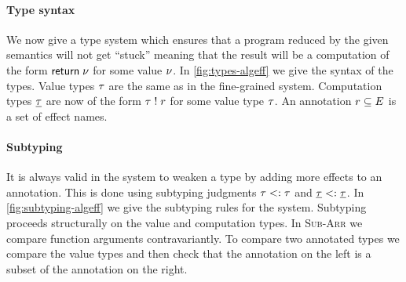{\paragraph{Type syntax}
We now give a type system which ensures that a program reduced by the given semantics will not get ``stuck'' meaning that the result will be a computation of the form $\mathsf{return} \; \nu$ for some value $\nu$.
In \cref{fig:types-algeff} we give the syntax of the types.
Value types $\tau$ are the same as in the fine-grained system.
Computation types $\underline{\tau}$ are now of the form $\tau \; ! \; r$ for some value type $\tau$.
An annotation $r \subseteq E$ is a set of effect names.

\paragraph{Subtyping}
It is always valid in the system to weaken a type by adding more effects to an annotation.
This is done using subtyping judgments $\tau <: \tau$ and $\underline{\tau} <: \underline{\tau}$.
In \cref{fig:subtyping-algeff} we give the subtyping rules for the system.
Subtyping proceeds structurally on the value and computation types.
In \textsc{Sub-Arr} we compare function arguments contravariantly.
To compare two annotated types we compare the value types and then check that the annotation on the left is a subset of the annotation on the right.

}
